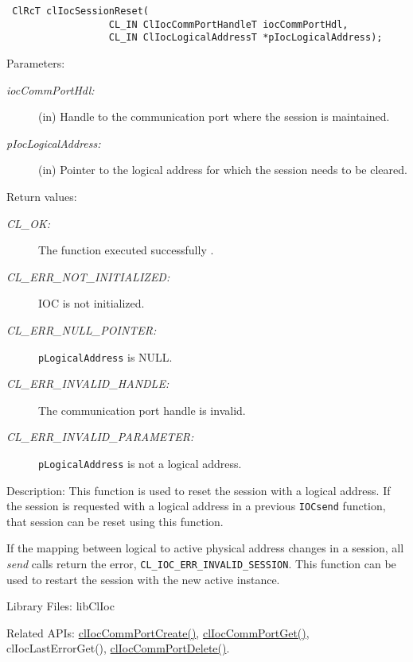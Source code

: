 \begin{flushleft}
\begin{Desc}
\footnotesize\begin{verbatim} ClRcT clIocSessionReset(
                  CL_IN ClIocCommPortHandleT iocCommPortHdl,
                  CL_IN ClIocLogicalAddressT *pIocLogicalAddress);
\end{verbatim}
\normalsize
\end{Desc}
\begin{Desc}
\item[Parameters:]
\begin{description}
\item[{\em ioc\-Comm\-Port\-Hdl:}](in) Handle to the communication port where the session is maintained. 
\item[{\em p\-Ioc\-Logical\-Address:}](in) Pointer to the logical address for which the session needs to be cleared.\end{description}
\end{Desc}
\begin{Desc}
\item[Return values:]
\begin{description}
\item[{\em CL\_\-OK:}]The function executed successfully . \item[{\em CL\_\-ERR\_\-NOT\_\-INITIALIZED:}]IOC is not initialized. 
\item[{\em CL\_\-ERR\_\-NULL\_\-POINTER:}] {\tt{p\-Logical\-Address}} is NULL. \item[{\em CL\_\-ERR\_\-INVALID\_\-HANDLE:}] 
The communication port handle is invalid. \item[{\em CL\_\-ERR\_\-INVALID\_\-PARAMETER:}] {\tt{p\-Logical\-Address}} is not a logical address.
\end{description}
\end{Desc}
\begin{Desc}
\item[Description:]This function is used to reset the session with a logical address. If the session is requested with a logical address in a previous 
{\tt{IOCsend}} function, that session can be reset using this function. 
\par
If the mapping between logical to active physical address changes in a session, 
all \textit{send} calls return the error, {\tt{CL\_\-IOC\_\-ERR\_\-INVALID\_\-SESSION}}. This function can be used to restart the session with the 
new active instance.\end{Desc}
\begin{Desc}
\item[Library Files:]libClIoc\end{Desc}
\begin{Desc}
\item[Related APIs:]\hyperlink{pageioc101}{clIocCommPortCreate()}, \hyperlink{pageIOC102}{clIocCommPortGet()}, {clIocLastErrorGet()}, 
\hyperlink{pageioc103}{clIocCommPortDelete()}. \end{Desc}




\end{flushleft}
